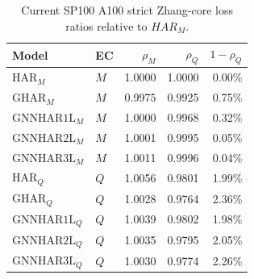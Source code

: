 \begin{table}[H]
\centering
\small
\begin{tabular}{llrrr}
\toprule
Model & EC & \(\rho_M\) & \(\rho_Q\) & \(1-\rho_Q\) \\
\midrule
\(\mathrm{HAR}_{M}\) & \(M\) & 1.0000 & 1.0000 & 0.00\% \\
\(\mathrm{GHAR}_{M}\) & \(M\) & 0.9975 & 0.9925 & 0.75\% \\
\(\mathrm{GNNHAR1L}_{M}\) & \(M\) & 1.0000 & 0.9968 & 0.32\% \\
\(\mathrm{GNNHAR2L}_{M}\) & \(M\) & 1.0001 & 0.9995 & 0.05\% \\
\(\mathrm{GNNHAR3L}_{M}\) & \(M\) & 1.0011 & 0.9996 & 0.04\% \\
\(\mathrm{HAR}_{Q}\) & \(Q\) & 1.0056 & 0.9801 & 1.99\% \\
\(\mathrm{GHAR}_{Q}\) & \(Q\) & 1.0028 & 0.9764 & 2.36\% \\
\(\mathrm{GNNHAR1L}_{Q}\) & \(Q\) & 1.0039 & 0.9802 & 1.98\% \\
\(\mathrm{GNNHAR2L}_{Q}\) & \(Q\) & 1.0035 & 0.9795 & 2.05\% \\
\(\mathrm{GNNHAR3L}_{Q}\) & \(Q\) & 1.0030 & 0.9774 & 2.26\% \\
\bottomrule
\end{tabular}
\caption{Current SP100 A100 strict Zhang-core loss ratios relative to \(HAR_M\).}
\label{tab:sp100-a100-core-loss}
\end{table}
